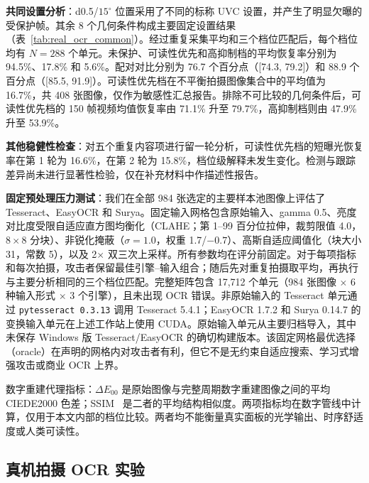 \textbf{共同设置分析}：d0.5/$15^{\circ}$ 位置采用了不同的标称 UVC 设置，并产生了明显欠曝的受保护帧。其余 8 个几何条件构成主要固定设置结果（表~\ref{tab:real_ocr_common}）。经过重复采集平均和三个档位匹配后，每个档位均有 $N=288$ 个单元。未保护、可读性优先和高抑制档的平均恢复率分别为 94.5\%、17.8\% 和 5.6\%。配对对比分别为 76.7 个百分点（[74.3, 79.2]）和 88.9 个百分点（[85.5, 91.9]）。可读性优先档在不平衡拍摄图像集合中的平均值为 16.7\%，共 408 张图像，仅作为敏感性汇总报告。排除不可比较的几何条件后，可读性优先档的 150 帧视频均值恢复率由 71.1\% 升至 79.7\%，高抑制档则由 47.9\% 升至 53.9\%。

\textbf{其他稳健性检查}：对五个重复内容项进行留一轮分析，可读性优先档的短曝光恢复率在第 1 轮为 16.6\%，在第 2 轮为 15.8\%，档位级解释未发生变化。检测与跟踪差异尚未进行显著性检验，仅在补充材料中作描述性报告。

\textbf{固定预处理压力测试}：我们在全部 984 张选定的主要样本池图像上评估了 Tesseract、EasyOCR 和 Surya。固定输入网格包含原始输入、gamma 0.5、亮度对比度受限自适应直方图均衡化（CLAHE；第 1--99 百分位拉伸，裁剪限值 4.0，$8\times8$ 分块）、非锐化掩蔽（$\sigma=1.0$，权重 1.7/$-0.7$）、高斯自适应阈值化（块大小 31，常数 5），以及 2$\times$ 双三次上采样。所有参数均在评分前固定。对于每项指标和每次拍摄，攻击者保留最佳引擎--输入组合；随后先对重复拍摄取平均，再执行与主要分析相同的三个档位匹配。完整矩阵包含 17,712 个单元（984 张图像 $\times$ 6 种输入形式 $\times$ 3 个引擎），且未出现 OCR 错误。非原始输入的 Tesseract 单元通过 \texttt{pytesseract 0.3.13} 调用 Tesseract 5.4.1；EasyOCR 1.7.2 和 Surya 0.14.7 的变换输入单元在上述工作站上使用 CUDA。原始输入单元从主要归档导入，其中未保存 Windows 版 Tesseract/EasyOCR 的确切构建版本。该固定网格最优选择（oracle）在声明的网格内对攻击者有利，但它不是无约束自适应搜索、学习式增强攻击或商业 OCR 上界。

数字重建代理指标：$\Delta E_{00}$ 是原始图像与完整周期数字重建图像之间的平均 CIEDE2000 色差；SSIM~\cite{b_wang2004} 是二者的平均结构相似度。两项指标均在数字管线中计算，仅用于本文内部的档位比较。两者均不能衡量真实面板的光学输出、时序舒适度或人类可读性。

\subsection{真机拍摄 OCR 实验}
\label{sec:real_capture}

